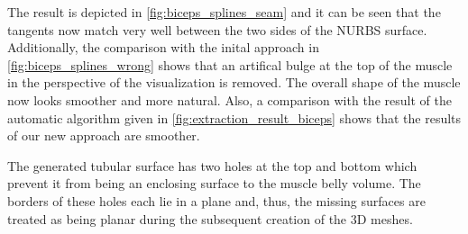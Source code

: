 The result is depicted in \cref{fig:biceps_splines_seam} and it can be seen that the tangents now match very well between the two sides of the NURBS surface. Additionally, the comparison with the inital approach in \cref{fig:biceps_splines_wrong} shows that an artifical bulge at the top of the muscle in the perspective of the visualization is removed. The overall shape of the muscle now looks smoother and more natural. Also, a comparison with the result of the automatic algorithm given in \cref{fig:extraction_result_biceps} shows that the results of our new approach are smoother.

The generated tubular surface has two holes at the top and bottom which prevent it from being an enclosing surface to the muscle belly volume. The borders of these holes each lie in a plane and, thus, the missing surfaces are treated as being planar during the subsequent creation of the 3D meshes.
%
